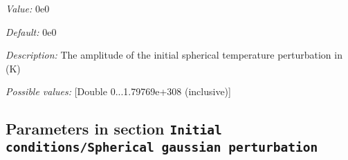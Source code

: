 \begin{itemize}
{\it Value:} 0e0


{\it Default:} 0e0


{\it Description:} The amplitude of the initial spherical temperature perturbation in (K)


{\it Possible values:} [Double 0...1.79769e+308 (inclusive)]
\end{itemize}

\subsection{Parameters in section \tt Initial conditions/Spherical gaussian perturbation}
\label{parameters:Initial_20conditions/Spherical_20gaussian_20perturbation}

